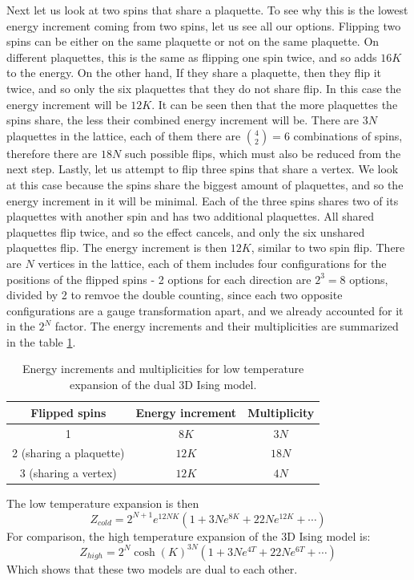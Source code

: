 \documentclass{article}
\begin{document}
\newline 
Next let us look at two spins that share a plaquette. To see why this is the lowest energy increment coming from two spins, let us see all our options. Flipping two spins can be either on the same plaquette or not on the same plaquette. On different plaquettes, this is the same as flipping one spin twice, and so adds $16K$ to the energy.
On the other hand, If they share a plaquette, then they flip it twice, and so only the six plaquettes that they do not share flip. In this case the energy increment will be $12K$. It can be seen then that the more plaquettes the spins share, the less their combined energy increment will be. There are $3N$ plaquettes in the lattice, each of them there are $\binom{4}{2} = 6$ combinations of spins, therefore there are $18N$ such possible flips, which must also be reduced from the next step.
\newline
Lastly, let us attempt to flip three spins that share a vertex. We look at this case because the spins share the biggest amount of plaquettes, and so the energy increment in it will be minimal. Each of the three spins shares two of its plaquettes with another spin and has two additional plaquettes. All shared plaquettes flip twice, and so the effect cancels, and only the six unshared plaquettes flip. The energy increment is then $12K$, similar to two spin flip. There are $N$ vertices in the lattice, each of them includes four configurations for the positions of the flipped spins - 2 options for each direction are $2^3 = 8$ options, divided by 2 to remvoe the double counting, since each two opposite configurations are a gauge transformation apart, and we already accounted for it in the $2^N$ factor. The energy increments and their multiplicities are summarized in the table \ref{tab:energy_increments}.
\begin{table}[h]
    \centering
    \begin{tabular}{|c|c|c|}
        \hline
        Flipped spins & Energy increment & Multiplicity \\
        \hline
        1 & $8K$ & $3N$ \\
        \hline
        2 (sharing a plaquette) & $12K$ & $18N$ \\
        \hline
        3 (sharing a vertex) & $12K$ & $4N$ \\
        \hline
    \end{tabular}
    \caption{Energy increments and multiplicities for low temperature expansion of the dual 3D Ising model.}
    \label{tab:energy_increments}
\end{table}
The low temperature expansion is then
\begin{equation}
    Z_{cold} = 2^{N+1} e^{12NK}\left(
        1 + 3N e^{8K} + 22N e^{12K} + \cdots
    \right)
\end{equation}
For comparison, the high temperature expansion of the 3D Ising model is:
\begin{equation}
    Z_{high} = 2^N \cosh(K)^{3N}\left(
        1 + 3N e^{4T} + 22N e^{6T} + \cdots
    \right)
\end{equation}
Which shows that these two models are dual to each other.
\end{document}
